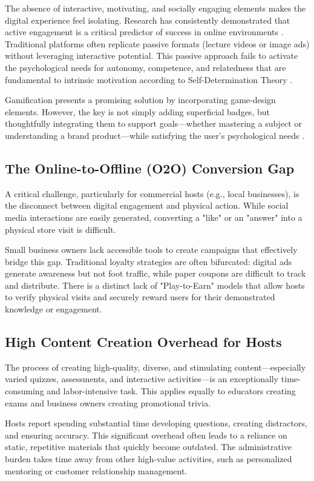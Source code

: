 The absence of interactive, motivating, and socially engaging elements makes the digital experience feel isolating. Research has consistently demonstrated that active engagement is a critical predictor of success in online environments \citep{fredricks2019}. Traditional platforms often replicate passive formats (lecture videos or image ads) without leveraging interactive potential. This passive approach fails to activate the psychological needs for autonomy, competence, and relatedness that are fundamental to intrinsic motivation according to Self-Determination Theory \citep{deci2020}.

Gamification presents a promising solution by incorporating game-design elements. However, the key is not simply adding superficial badges, but thoughtfully integrating them to support goals—whether mastering a subject or understanding a brand product—while satisfying the user's psychological needs \citep{oliveira2023}.

\subsection{The Online-to-Offline (O2O) Conversion Gap}
A critical challenge, particularly for commercial hosts (e.g., local businesses), is the disconnect between digital engagement and physical action. While social media interactions are easily generated, converting a "like" or an "answer" into a physical store visit is difficult.

Small business owners lack accessible tools to create campaigns that effectively bridge this gap. Traditional loyalty strategies are often bifurcated: digital ads generate awareness but not foot traffic, while paper coupons are difficult to track and distribute. There is a distinct lack of "Play-to-Earn" models that allow hosts to verify physical visits and securely reward users for their demonstrated knowledge or engagement.

\subsection{High Content Creation Overhead for Hosts}
The process of creating high-quality, diverse, and stimulating content—especially varied quizzes, assessments, and interactive activities—is an exceptionally time-consuming and labor-intensive task. This applies equally to educators creating exams and business owners creating promotional trivia.

Hosts report spending substantial time developing questions, creating distractors, and ensuring accuracy. This significant overhead often leads to a reliance on static, repetitive materials that quickly become outdated. The administrative burden takes time away from other high-value activities, such as personalized mentoring or customer relationship management.

